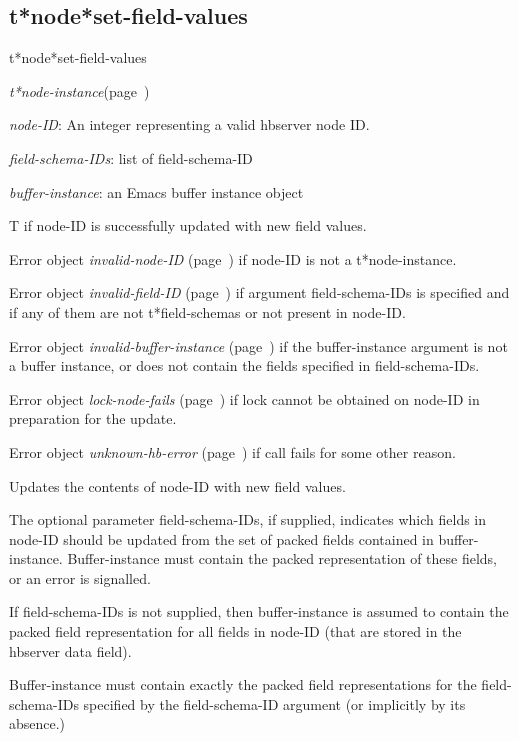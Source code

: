 \subsection{t*node*set-field-values}
\label{t*node*set-field-values}

\begin{description}
\item [Name:]  t*node*set-field-values

\item [Class:] {\sl t*node-instance}\hfill(page~\pageref{t*node-instance})

\item [Parameters:]
\item {\sl node-ID}:   An integer representing
a valid hbserver node ID.

\item {\sl field-schema-IDs}:  list of field-schema-ID

\item {\sl buffer-instance}:  an Emacs buffer instance object


\item [Return-value:]
T if node-ID is successfully updated with new
field values.

Error object {\sl invalid-node-ID} (page~\pageref{invalid-node-ID}) if node-ID
is not a t*node-instance.

Error object {\sl invalid-field-ID} (page~\pageref{invalid-field-ID}) if argument
field-schema-IDs is specified and if any of them
are not t*field-schemas or not present in node-ID.

Error object {\sl invalid-buffer-instance} (page~\pageref{invalid-buffer-instance}) if the 
buffer-instance argument is not a buffer instance,
or does not contain the fields specified in 
field-schema-IDs.

Error object {\sl lock-node-fails} (page~\pageref{lock-node-fails}) if lock cannot 
be obtained on node-ID in preparation for the update.

Error object {\sl unknown-hb-error} (page~\pageref{unknown-hb-error}) if call fails
for some other reason.

\item [Description:]
Updates the contents of node-ID with new field
values.

The optional parameter field-schema-IDs, if supplied,
indicates which fields in node-ID should be updated
from the set of packed fields contained in
buffer-instance.  Buffer-instance must contain the
packed representation of these fields, or an error is
signalled. 

If field-schema-IDs is not supplied, then
buffer-instance is assumed to contain the packed
field representation for all fields in node-ID (that
are stored in the hbserver data field).

Buffer-instance must contain exactly the packed field
representations for the field-schema-IDs specified by
the field-schema-ID argument (or implicitly by its
absence.)


\item [Public:]



\end{description}
\horizontalline

